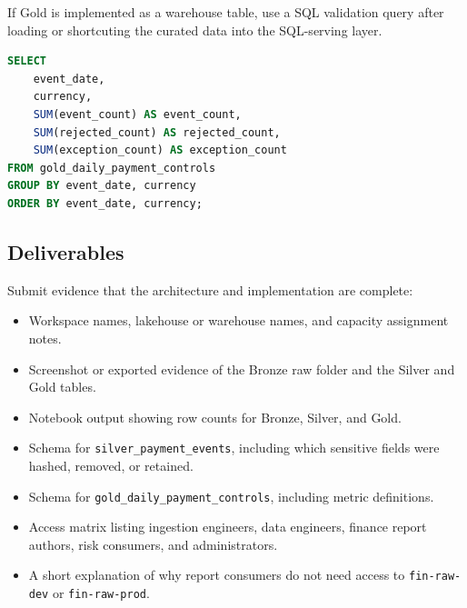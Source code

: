 If Gold is implemented as a warehouse table, use a SQL validation query after loading or shortcuting the curated data into the SQL-serving layer.

\begin{lstlisting}[language=SQL,caption={Capstone SQL validation for curated financial control metrics.}]
SELECT
    event_date,
    currency,
    SUM(event_count) AS event_count,
    SUM(rejected_count) AS rejected_count,
    SUM(exception_count) AS exception_count
FROM gold_daily_payment_controls
GROUP BY event_date, currency
ORDER BY event_date, currency;
\end{lstlisting}

\subsection*{Deliverables}
Submit evidence that the architecture and implementation are complete:
\begin{itemize}
    \item Workspace names, lakehouse or warehouse names, and capacity assignment notes.
    \item Screenshot or exported evidence of the Bronze raw folder and the Silver and Gold tables.
    \item Notebook output showing row counts for Bronze, Silver, and Gold.
    \item Schema for \texttt{silver\_payment\_events}, including which sensitive fields were hashed, removed, or retained.
    \item Schema for \texttt{gold\_daily\_payment\_controls}, including metric definitions.
    \item Access matrix listing ingestion engineers, data engineers, finance report authors, risk consumers, and administrators.
    \item A short explanation of why report consumers do not need access to \texttt{fin-raw-dev} or \texttt{fin-raw-prod}.
\end{itemize}

